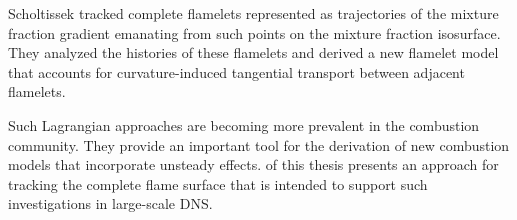 %
Scholtissek \etal \cite{Scholtissek2017} tracked complete flamelets represented
as trajectories of the mixture fraction gradient emanating from such points on
the mixture fraction isosurface.
%
They analyzed the histories of these flamelets and derived a new flamelet model
that accounts for curvature-induced tangential transport between adjacent
flamelets.
%

%
Such Lagrangian approaches are becoming more prevalent in the combustion
community.
%
They provide an important tool for the derivation of new combustion models
that incorporate unsteady effects.
%
 of this thesis presents an approach for
tracking the complete flame surface that is intended to support such
investigations in large-scale \ac{DNS}.
%
%
